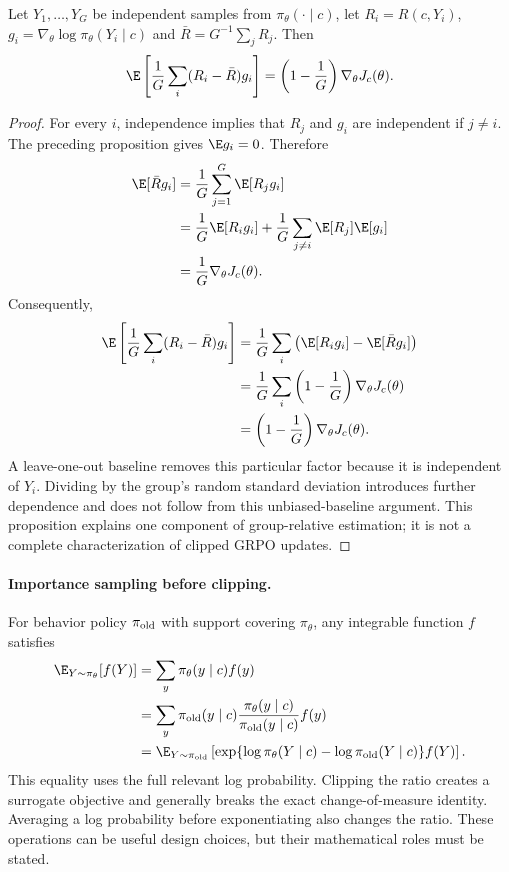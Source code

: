 \begin{proposition}
Let $Y_1,\ldots,Y_G$ be independent samples from $\pi_\theta(\cdot\mid c)$, let $R_i=R(c,Y_i)$, $g_i=\nabla_\theta\log\pi_\theta(Y_i\mid c)$ and $\bar R=G^{-1}\sum_jR_j$. Then
\begin{equation}
\E\left[\frac1G\sum_i(R_i-\bar R)g_i\right]
 =\left(1-\frac1G\right)\nabla_\theta J_c(\theta).
\end{equation}
\end{proposition}
\begin{proof}
For every $i$, independence implies that $R_j$ and $g_i$ are independent if $j\ne i$. The preceding proposition gives $\E g_i=0$. Therefore
\begin{align}
\E[\bar Rg_i]
&=\frac1G\sum_{j=1}^G\E[R_jg_i]\\
&=\frac1G\E[R_ig_i]+\frac1G\sum_{j\ne i}\E[R_j]\E[g_i]\\
&=\frac1G\nabla_\theta J_c(\theta).
\end{align}
Consequently,
\begin{align}
\E\left[\frac1G\sum_i(R_i-\bar R)g_i\right]
&=\frac1G\sum_i\left(\E[R_ig_i]-\E[\bar Rg_i]\right)\\
&=\frac1G\sum_i\left(1-\frac1G\right)\nabla_\theta J_c(\theta)\\
&=\left(1-\frac1G\right)\nabla_\theta J_c(\theta).
\end{align}
A leave-one-out baseline removes this particular factor because it is independent of $Y_i$. Dividing by the group's random standard deviation introduces further dependence and does not follow from this unbiased-baseline argument. This proposition explains one component of group-relative estimation; it is not a complete characterization of clipped GRPO updates.
\end{proof}

\paragraph{Importance sampling before clipping.}
For behavior policy $\pi_{\rm old}$ with support covering $\pi_\theta$, any integrable function $f$ satisfies
\begin{align}
\E_{Y\sim\pi_\theta}[f(Y)]
&=\sum_y\pi_\theta(y\mid c)f(y)\\
&=\sum_y\pi_{\rm old}(y\mid c)
 \frac{\pi_\theta(y\mid c)}{\pi_{\rm old}(y\mid c)}f(y)\\
&=\E_{Y\sim\pi_{\rm old}}\left[
 \exp\{\log\pi_\theta(Y\mid c)-\log\pi_{\rm old}(Y\mid c)\}f(Y)\right].
\end{align}
This equality uses the full relevant log probability. Clipping the ratio creates a surrogate objective and generally breaks the exact change-of-measure identity. Averaging a log probability before exponentiating also changes the ratio. These operations can be useful design choices, but their mathematical roles must be stated.

